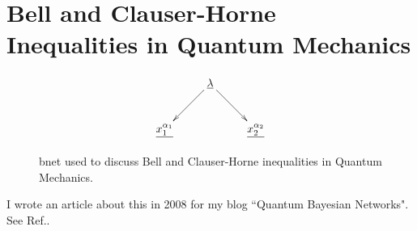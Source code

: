 \chapter{Bell  
and Clauser-Horne Inequalities 
in Quantum Mechanics}

\begin{figure}[h!]
\centering
$$\xymatrix{
&\ul{\lambda}\ar[dr]\ar[dl]&\\
\ul{x_1^{\alpha_1}}&&\ul{x_2^{\alpha_2}}
}$$
\caption{bnet used to discuss Bell 
and Clauser-Horne inequalities 
in Quantum Mechanics.}
\label{fig-monty}
\end{figure}

I wrote an article about
this in 2008 for
my blog ``Quantum Bayesian Networks". 
See Ref.\cite{bell-blog}.